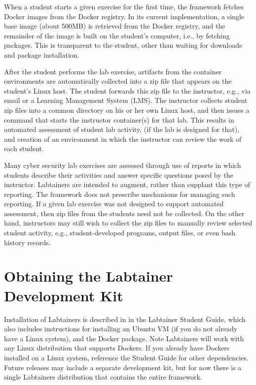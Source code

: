 \documentclass[12pt]{article}
\begin{document}
When a student starts a given exercise for the first time, the framework fetches
Docker images from the Docker registry.  In its current implementation, a single
base image (about 500MB) is retrieved from the Docker registry, and the remainder of the image
is built on the student's computer, i.e., by fetching packages. This is transparent to
the student, other than waiting for downloads and package installation. 

After the student performs the lab exercise, artifacts from the container
environments are automatically collected into a zip file that appears on
the student's Linux host.  The student forwards this zip file to the instructor,
e.g., via email or a Learning Management System (LMS).  The instructor collects student zip files into a common
directory on his or her own Linux host, and then issues a command that starts
the instructor container(s) for that lab.  This results in automated assessment of student lab
activity, (if the lab is designed for that), and creation of an environment
in which the instructor can review the work of each student.

Many cyber security lab exercises are assessed through use of reports in which students
describe their activities and answer specific questions posed by the instructor.  Labtainers
are intended to augment, rather than supplant this type of reporting.  The framework does not
prescribe mechanisms for managing such reporting.  If a given lab exercise was not designed
to support automated assessment, then zip files from the students need not be collected.  On
the other hand, instructors may still wish to collect the zip files to manually review selected
student activity, e.g., student-developed programs, output files, or even bash history records.  

\section {Obtaining the Labtainer Development Kit}
Installation of Labtainers is described in in the Labtainer Student Guide,  
which also includes instructions for installing an Ubuntu VM (if you do not already have a Linux system),
and the Docker package.  Note Labtainers will work with any Linux
distribution that supports Dockers.  If you already have Dockers installed on a Linux system, 
reference the Student Guide for other dependencies. 
Future releases may include a separate development kit, but for now there is a single Labtainers distribution
that contains the entire framework.
\end{document}
